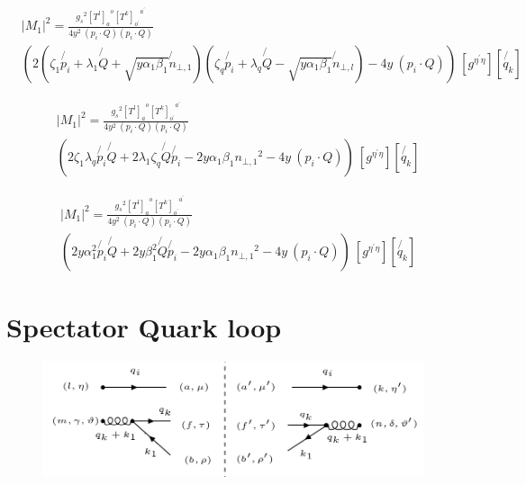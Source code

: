 \begin{equation}
\begin{split}
&|M_1|^2=\frac{{g_s}^2 {[T^l]_a}^o {[T^k]_{o^{\prime}}}^{a^{\prime}}}{4y^2\:(p_i\cdot Q)(p_i\cdot Q) }\\&
(2(\zeta_1 \not{p_i} + \lambda_1\not{Q} + \sqrt{y\alpha_1\beta_1}\not{n}_{\bot,1} )( \zeta_q\not{p_i} + \lambda_q\not{Q} - \sqrt{y\alpha_1\beta_1}\not{n}_{\bot,l})-4y\:(p_i\cdot Q ))\: [{g}^{{\eta}^{\prime} \eta} ][\not{q_k}]
\end{split}
\end{equation}

\begin{equation}
\begin{split}
&|M_1|^2=\frac{{g_s}^2 {[T^l]_a}^o {[T^k]_{o^{\prime}}}^{a^{\prime}}}{4y^2\:(p_i\cdot Q)(p_i\cdot Q) }\\&
(2\zeta_1\lambda_q \not{p_i}\not{Q} +2\lambda_1\zeta_q\not{Q}\not{p_i} - 2{y\alpha_1\beta_1}{{n}_{\bot,1}}^2-4y\:(p_i\cdot Q ))\: [{g}^{{\eta}^{\prime} \eta} ][\not{q_k}]
\end{split}
\end{equation}

\begin{equation}
\begin{split}
&|M_1|^2=\frac{{g_s}^2 {[T^l]_a}^o {[T^k]_{o^{\prime}}}^{a^{\prime}}}{4y^2\:(p_i\cdot Q)(p_i\cdot Q) }\\&
(2y\alpha_1^2 \not{p_i}\not{Q} +2y\beta_1^2\not{Q}\not{p_i} - 2{y\alpha_1\beta_1}{{n}_{\bot,1}}^2-4y\:(p_i\cdot Q ))\: [{g}^{{\eta}^{\prime} \eta} ][\not{q_k}]
\end{split}
\end{equation}

\pagebreak

\section{Spectator Quark loop}
\begin{figure}[ht!]
\centering
\includegraphics[scale=0.7]{images/QG/M2Squer.png}
\end{figure}


